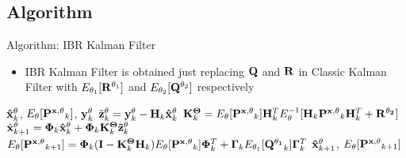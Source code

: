 \subsection{Algorithm}
\begin{frame}{Algorithm: IBR Kalman Filter}

\begin{itemize}
    \item IBR Kalman Filter is obtained just replacing ${\bf Q}$ and ${\bf R}$ in Classic Kalman Filter with $E_{\theta_1}[{\bf R}^{\theta_1}]$ and $E_{\theta_2}[{\bf Q}^{\theta_2}]$ respectively
\end{itemize}

\begin{algorithm}[H]
\caption{IBR Kalman Filter}
\begin{algorithmic}[1]
\REQUIRE ${\bf \hat x}^{\theta}_k$, $E_\theta[{\bf P^{x, \theta}}_{k}]$, ${\bf y}^{\theta}_k$
\STATE $\tilde {\bf z}^{\bf \theta}_k = {\bf y}^{\bf \theta}_k - {\bf H}_k{\bf \hat x}^{\bf \theta}_k$
\STATE ${\bf K}^{\bf \Theta}_k = E_\theta[{\bf P^{x, \theta}}_k]{\bf H}^T_kE_\theta^{-1}[{\bf H}_k{\bf P^{x, \theta}}_k{\bf H}^T_k+{\bf R^{\theta_2}}]$
\STATE $\hat{\bf x}^{\theta}_{k+1} = {\bf \Phi}_k{\bf \hat x}^{\theta}_k+{\bf \Phi}_k{\bf K}^{\bf \Theta}_k{\bf \tilde z}^{\theta}_k$
\STATE $E_\theta[{\bf P^{x, \theta}}_{k+1}] = {\bf \Phi}_k({\bf I}-{\bf K}^{\bf \Theta}_k{\bf H}_k)E_\theta[{\bf P^{x, \theta}}_k]{\bf \Phi}^T_k + {\bf \Gamma}_kE_{\theta_1}[{\bf Q^{\theta_1}}_k]{\bf \Gamma}_k^T$
\ENSURE ${\bf \hat x}^{\theta}_{k+1}$, $E_\theta[{\bf P^{x, \theta}}_{k+1}]$
\end{algorithmic}
\end{algorithm}
\end{frame}